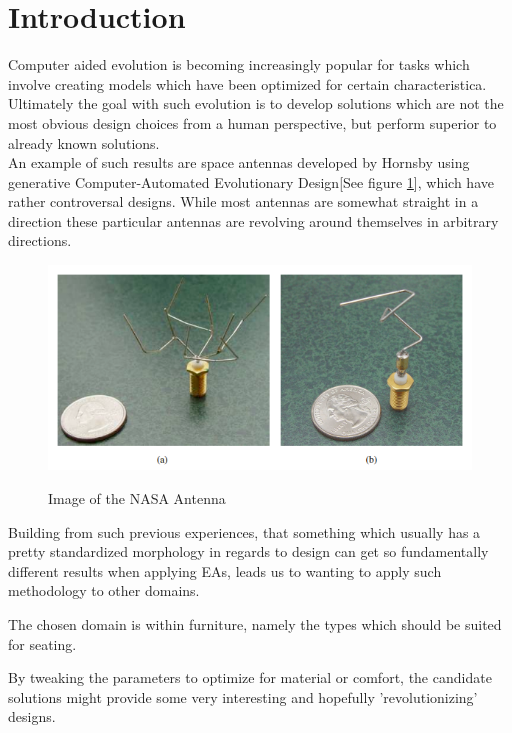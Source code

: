 \section{Introduction}
Computer aided evolution is becoming increasingly popular for tasks which involve creating models which have been optimized for certain characteristica.
Ultimately the goal with such evolution is to develop solutions which are not the most obvious design choices from a human perspective, but perform superior to already known solutions.\\

An example of such results are space antennas developed by Hornsby\cite{paper:ev4} using generative Computer-Automated Evolutionary Design[See figure \ref{fig:nasa_antenna}], which have rather controversal designs. While most antennas are somewhat straight in a direction these particular antennas are revolving around themselves in arbitrary directions.

\begin{figure}[ht]
\includegraphics[scale=.7]{content/img/space_antenna}
\label{fig:nasa_antenna}\\
\caption{Image of the NASA Antenna \cite{paper:ev4} }
\end{figure}

Building from such previous experiences, that something which usually has a pretty standardized morphology in regards to design can get so fundamentally different results when applying EAs, leads us to wanting to apply such methodology to other domains.

The chosen domain is within furniture, namely the types which should be suited for seating.

By tweaking the parameters to optimize for material or comfort, the candidate solutions might provide some very interesting and hopefully 'revolutionizing' designs.
